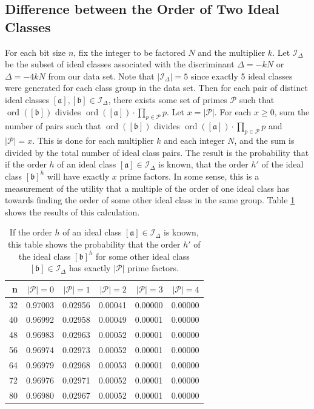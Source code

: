 \documentclass{ucalgthes1}
\theoremstyle{definition}
\DeclareMathOperator{\ord}{ord}
\newcommand{\floor}[1]{\left\lfloor #1 \right\rfloor}
\newcommand{\ideal}{\mathfrak}
\newcommand{\idealclass}[1]{\left[ \ideal #1 \right]}
\newcommand{\aclass}{\idealclass a}
\newcommand{\bclass}{\idealclass b}
\begin{document}

\subsection{Difference between the Order of Two Ideal Classes}
\label{subsec:ssparDiffBtwOrder}

\newcommand{\idelta}{\mathcal I_\Delta}

For each bit size $n$, fix the integer to be factored $N$ and the multiplier $k$. Let $\idelta$ be the subset of ideal classes associated with the discriminant $\Delta = -kN$ or $\Delta = -4kN$ from our data set.  Note that $|\idelta| = 5$ since exactly 5 ideal classes were generated for each class group in the data set.  Then for each pair of distinct ideal classes $\aclass, \bclass \in \idelta$, there exists some set of primes $\mathcal P$ such that $\ord(\bclass)$ divides $\ord(\aclass) \cdot \prod_{p \in \mathcal P} p$.  Let $x = |\mathcal P|$.  For each $x \ge 0$, sum the number of pairs such that $\ord(\bclass)$ divides $\ord(\aclass) \cdot \prod_{p \in \mathcal P} p$ and $|\mathcal P| = x$.  This is done for each multiplier $k$ and each integer $N$, and the sum is divided by the total number of ideal class pairs.  The result is the probability that if the order $h$ of an ideal class $\aclass \in \idelta$ is known, that the order $h'$ of the ideal class $\bclass^h$ will have exactly $x$ prime factors.  In some sense, this is a measurement of the utility that a multiple of the order of one ideal class has towards finding the order of some other ideal class in the same group.  Table \ref{tab:diffOfOrderOfTwoIdeals} shows the results of this calculation.

\begin{table}[h]
\centering
\begin{tabular}{| r | r | r | r | r | r |}
	\hline
	n & $|\mathcal P| = 0$ & $|\mathcal P| = 1$ & $|\mathcal P| = 2$ & $|\mathcal P| = 3$ & $|\mathcal P| = 4$ \\
	\hline
32 & 0.97003 & 0.02956 & 0.00041 & 0.00000 & 0.00000 \\
40 & 0.96992 & 0.02958 & 0.00049 & 0.00001 & 0.00000 \\
48 & 0.96983 & 0.02963 & 0.00052 & 0.00001 & 0.00000 \\
56 & 0.96974 & 0.02973 & 0.00052 & 0.00001 & 0.00000 \\
64 & 0.96979 & 0.02968 & 0.00053 & 0.00001 & 0.00000 \\
72 & 0.96976 & 0.02971 & 0.00052 & 0.00001 & 0.00000 \\
80 & 0.96980 & 0.02967 & 0.00052 & 0.00001 & 0.00000 \\
	\hline
\end{tabular}
\caption{If the order $h$ of an ideal class $\aclass \in \idelta$ is known, this table shows the probability that the order $h'$ of the ideal class $\bclass^h$ for some other ideal class $\bclass \in \idelta$ has exactly $|\mathcal P|$ prime factors.}
\label{tab:diffOfOrderOfTwoIdeals}
\end{table}
\end{document}
